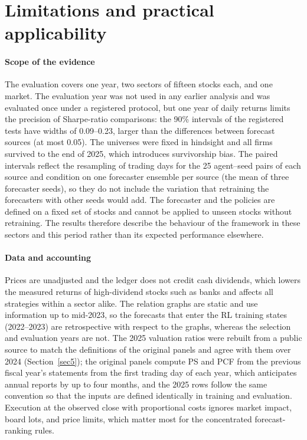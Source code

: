 \documentclass[pdflatex,sn-mathphys-num]{sn-jnl}%
\theoremstyle{thmstyleone}%
\theoremstyle{thmstyletwo}%
\theoremstyle{thmstylethree}%
\begin{document}
\section{Limitations and practical applicability}\label{sec:limitations}

{\color{blue}\paragraph{Scope of the evidence}
The evaluation covers one year, two sectors of fifteen stocks each, and one market. The evaluation year was not used in any earlier analysis and was evaluated once under a registered protocol, but one year of daily returns limits the precision of Sharpe-ratio comparisons: the 90\% intervals of the registered tests have widths of 0.09--0.23, larger than the differences between forecast sources (at most 0.05). The universes were fixed in hindsight and all firms survived to the end of 2025, which introduces survivorship bias. The paired intervals reflect the resampling of trading days for the 25 agent--seed pairs of each source and condition on one forecaster ensemble per source (the mean of three forecaster seeds), so they do not include the variation that retraining the forecasters with other seeds would add. The forecaster and the policies are defined on a fixed set of stocks and cannot be applied to unseen stocks without retraining. The results therefore describe the behaviour of the framework in these sectors and this period rather than its expected performance elsewhere.

\paragraph{Data and accounting}
Prices are unadjusted and the ledger does not credit cash dividends, which lowers the measured returns of high-dividend stocks such as banks and affects all strategies within a sector alike. The relation graphs are static and use information up to mid-2023, so the forecasts that enter the RL training states (2022--2023) are retrospective with respect to the graphs, whereas the selection and evaluation years are not. The 2025 valuation ratios were rebuilt from a public source to match the definitions of the original panels and agree with them over 2024 (Section~\ref{sec5}); the original panels compute PS and PCF from the previous fiscal year's statements from the first trading day of each year, which anticipates annual reports by up to four months, and the 2025 rows follow the same convention so that the inputs are defined identically in training and evaluation. Execution at the observed close with proportional costs ignores market impact, board lots, and price limits, which matter most for the concentrated forecast-ranking rules.

}
\end{document}
